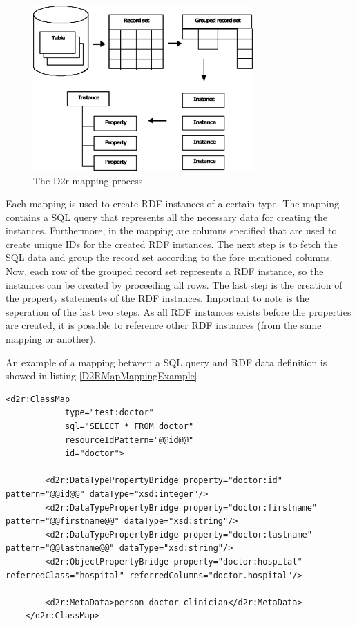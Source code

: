 \begin{figure}[H]
	\begin{center}
		\includegraphics[width=0.75\textwidth]{figures/MappingProcess.png}
	\end{center}
	\caption{The D2r mapping process \cite{D2rMap_aDatabaseToRdfMappingLanguage}}
	\label{D2rMappingProcessFigure}
\end{figure}

Each mapping is used to create RDF instances of a certain type. The mapping contains a SQL query that represents all the necessary data for creating the instances. Furthermore, in the mapping are columns specified that are used to create unique IDs for the created RDF instances.
The next step is to fetch the SQL data and group the record set according to the fore mentioned columns. Now, each row of the grouped record set represents a RDF instance, so the instances can be created by proceeding all rows. The last step is the creation of the property statements of the RDF instances. Important to note is the seperation of the last two steps. As all RDF instances exists before the properties are created, it is possible to reference other RDF instances (from the same mapping or another).

An example of a mapping between a SQL query and RDF data definition is showed in listing \ref{D2RMapMappingExample}

\begin{lstlisting}[style=RdfCodeStyle, caption=Example of a MeDSpace D2rMap mapping, label=D2RMapMappingExample]
<d2r:ClassMap
			type="test:doctor"
			sql="SELECT * FROM doctor"
			resourceIdPattern="@@id@@"
			id="doctor">

		<d2r:DataTypePropertyBridge property="doctor:id" pattern="@@id@@" dataType="xsd:integer"/>
		<d2r:DataTypePropertyBridge property="doctor:firstname" pattern="@@firstname@@" dataType="xsd:string"/>
		<d2r:DataTypePropertyBridge property="doctor:lastname" pattern="@@lastname@@" dataType="xsd:string"/>
		<d2r:ObjectPropertyBridge property="doctor:hospital" referredClass="hospital" referredColumns="doctor.hospital"/>

		<d2r:MetaData>person doctor clinician</d2r:MetaData>
	</d2r:ClassMap>

\end{lstlisting}

